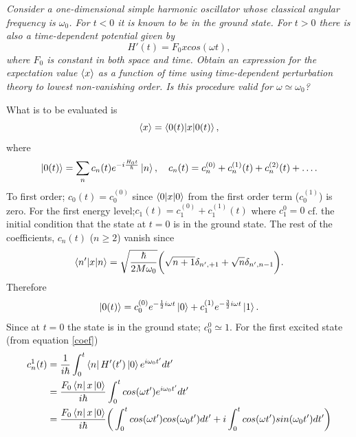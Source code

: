 \begin{example}
	\emph{Consider a one-dimensional simple harmonic oscillator whose classical angular frequency is $\omega_0$. For $t<0$ it is known to be in the ground state. For $t>0$ there is also a time-dependent potential given by}
	\begin{equation}
		H'(t)=F_0xcos(\omega t),
	\end{equation} 	
	\emph{where $F_0$ is constant in both space and time. Obtain an expression for the expectation value $\braket{x}$ as a function of time using time-dependent perturbation theory to lowest non-vanishing order. Is this procedure valid for $\omega\simeq \omega_0$?}\newline
	
	What is to be evaluated is
	\begin{equation}
		\braket{x}=\braket{0(t)|x|0(t)},
	\end{equation} 
	where
	\begin{equation}
		\ket{0(t)}=\sum_{n}c_n(t)e^{-i\frac{H_0t}{\hbar}}\ket{n}, \quad c_n(t)=c_n^{(0)}+c_n^{(1)}(t)+c_n^{(2)}(t)+\dots.
	\end{equation} 
	To first order; $c_0(t)=c_0^{(0)}$ since $\braket{0|x|0}$ from the first order term ($c_0^{(1)}$) is zero. For the first energy level;$c_1(t)=c_1^{(0)}+c_1^{(1)}(t)$ where $c_1^{0}=0$ cf. the initial condition that the state at $t=0$ is in the ground state. The rest of the coefficients, $c_n(t)$ ($n\geq2$) vanish since
	\begin{equation}
		\braket{n'|x|n}=\sqrt{\frac{\hbar}{2M\omega_0}}\bigg(\sqrt{n+1}\delta_{n',+1}+\sqrt{n}\delta_{n',n-1}\bigg).
		\label{hest}
	\end{equation} 
	Therefore
	\begin{equation}
		\ket{0(t)}=c_0^{(0)}e^{-\frac{1}{2}i\omega t}\ket{0}+c_1^{(1)}e^{-\frac{3}{2}i\omega t}\ket{1}.
	\end{equation} 
	Since at $t=0$ the state is in the ground state; $c_0^{0}\simeq1$. For the first excited state (from equation \eqref{coef})
	\begin{equation}
		\begin{split}
			c^1_{n}(t)&=\frac{1}{i\hbar}\int_{0}^{t}\bra{n}H'(t')\ket{0}e^{i\omega_{0}t'}dt'\\
			&=\frac{F_0\bra{n}x\ket{0}}{i\hbar}\int_{0}^{t}cos(\omega t')e^{i\omega_{0}t'}dt'\\
			&=\frac{F_0\bra{n}x\ket{0}}{i\hbar}\bigg(\int_{0}^{t}cos(\omega t')cos(\omega_0t')dt'+i\int_{0}^{t}cos(\omega t')sin(\omega_0t')dt'\bigg)\\

\end{split}
\end{equation}
\end{example}
